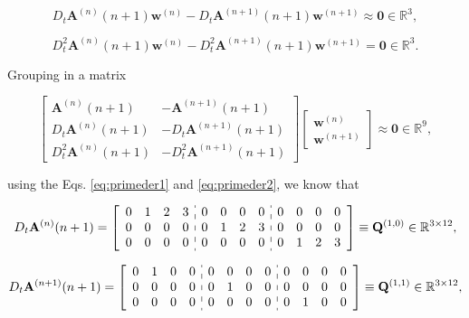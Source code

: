 \begin{equation}
D_{t}\mathbf{A}^{(n)}(n+1)
\mathbf{w}^{(n)}
-
D_{t}\mathbf{A}^{(n+1)}(n+1)
\mathbf{w}^{(n+1)}
\approx\mathbf{0}\in \mathbb{R}^{3},
\end{equation}


\begin{equation}
D_{t}^{2}\mathbf{A}^{(n)}(n+1)
\mathbf{w}^{(n)}
-
D_{t}^{2}\mathbf{A}^{(n+1)}(n+1)
\mathbf{w}^{(n+1)}
=\mathbf{0}\in \mathbb{R}^{3}.
\end{equation}

Grouping in a matrix

\begin{equation}
\begin{bmatrix}
\mathbf{A}^{(n)}(n+1) & -\mathbf{A}^{(n+1)}(n+1)\\
D_{t}\mathbf{A}^{(n)}(n+1) & -D_{t}\mathbf{A}^{(n+1)}(n+1)\\
D_{t}^{2}\mathbf{A}^{(n)}(n+1) & -D_{t}^{2}\mathbf{A}^{(n+1)}(n+1)
\end{bmatrix}
\begin{bmatrix}
\mathbf{w}^{(n)}\\
\mathbf{w}^{(n+1)}
\end{bmatrix}
\approx\mathbf{0}\in \mathbb{R}^{9},
\end{equation}


using the Eqs. \ref{eq:primeder1} and \ref{eq:primeder2}, 
we know that

\begin{equation}\label{eq:Q10}
D_{t} \mathbf{A}^{(n)}(n+1)
=
\left[
\begin{array}{cccc:cccc:cccc}
0 & 1 & 2 & 3 &
0 & 0 & 0 & 0 &
0 & 0 & 0 & 0 \\
0 & 0 & 0 & 0 &
0 & 1 & 2 & 3 &
0 & 0 & 0 & 0 \\
0 & 0 & 0 & 0 &
0 & 0 & 0 & 0 &
0 & 1 & 2 & 3 
\end{array}
\right]
\equiv \mathbf{Q}^{(1,0)}\in \mathbb{R}^{3\times 12},
\end{equation}

\begin{equation}\label{eq:Q11}
D_{t} \mathbf{A}^{(n+1)}(n+1)
=
\left[
\begin{array}{cccc:cccc:cccc}
0 & 1 & 0 & 0 &
0 & 0 & 0 & 0 &
0 & 0 & 0 & 0 \\
0 & 0 & 0 & 0 &
0 & 1 & 0 & 0 &
0 & 0 & 0 & 0 \\
0 & 0 & 0 & 0 &
0 & 0 & 0 & 0 &
0 & 1 & 0 & 0 
\end{array}
\right]
\equiv \mathbf{Q}^{(1,1)}\in \mathbb{R}^{3\times 12},
\end{equation}

